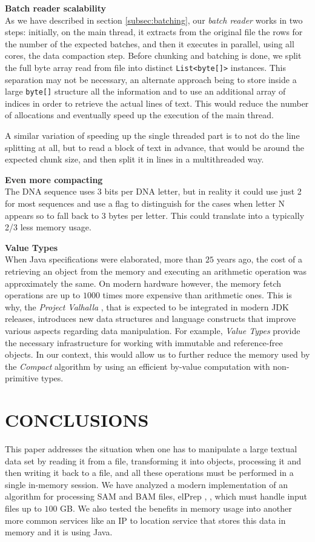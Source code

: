\documentclass[a4paper,twoside]{article}
\begin{document}
\textbf{Batch reader scalability} \\
As we have described in section \ref{subsec:batching}, our {\textit{batch reader} } works in two steps: initially, on the main thread, it extracts from the original file the rows for the number of the expected batches, and then it executes in parallel, using all cores, the data compaction step.
Before chunking and batching is done, we split the full byte array read from file into distinct  \texttt{List<byte[]>} instances.
This separation may not be necessary, an alternate approach being to store inside a large \texttt{byte[]} structure all the information and to use an additional array of indices in order to retrieve the actual lines of text.
This would reduce the number of allocations and eventually speed up the execution of the main thread.

A similar variation of speeding up the single threaded part is to not do the line splitting at all, but to read a block of text in advance, that would be around the expected chunk size,
and then split it in lines in a multithreaded way.

\textbf{Even more compacting} \\
The DNA sequence uses 3 bits per DNA letter, but in reality it could use just 2 for most sequences and use a flag to distinguish for the cases when letter N appears so to fall back to 3 bytes per letter. This could translate into a typically 2/3 less memory usage. 

\textbf{Value Types} \\
When Java specifications were elaborated, more than $25$ years ago, the cost of a retrieving an object from the memory and executing an arithmetic operation was approximately the same.
On modern hardware however, the memory fetch operations are up to $1000$ times more expensive than arithmetic ones.
This is why, the {\textit{Project Valhalla} } \cite{jdk:valhalla}, that is expected to be integrated in modern JDK releases, introduces new data structures and language constructs that improve various aspects regarding data manipulation.
For example, {\textit{Value Types} } provide the necessary infrastructure for working with immutable and reference-free objects.
In our context, this would allow us to further reduce the memory used by the {\textit{Compact} } algorithm by using an efficient by-value computation with non-primitive types.

\section{\uppercase{Conclusions}}
\label{sec:conclusions}
This paper addresses the situation when one has to manipulate a large textual data set by reading it from a file, transforming it into objects, processing it and then writing it back to a file, and all these operations must be performed in a single in-memory session.
We have analyzed a modern implementation of an algorithm for processing SAM and BAM files, elPrep \cite{herzeel:2015}, \cite{herzeel:2019}, which must handle input files up to $100$ GB. We also tested the benefits in memory usage into another more common services like an IP to location service that stores this data in memory and it is using Java.
\end{document}
